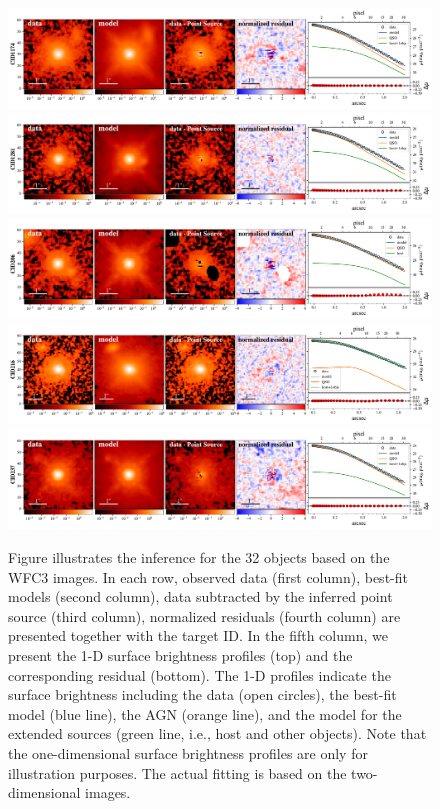 \documentclass[apj]{emulateapj}
\begin{document}
\begin{figure}
\centering
{
\includegraphics[height=0.25\textwidth]{fig/best_fit_CID1174_SB_profile.pdf}
\includegraphics[height=0.25\textwidth]{fig/best_fit_CID1281_SB_profile.pdf}
\includegraphics[height=0.25\textwidth]{fig/best_fit_CID206_SB_profile.pdf}
\includegraphics[height=0.25\textwidth]{fig/best_fit_CID216_SB_profile.pdf}
\includegraphics[height=0.25\textwidth]{fig/best_fit_CID237_SB_profile.pdf}
\caption{\label{fig:AGN_decomp} 
Figure illustrates the inference for the 32 objects based on the WFC3 images.
In each row, observed data (first column), best-fit models (second column), data subtracted by the inferred point source (third column),  normalized residuals (fourth column) are presented together with the target ID. In the fifth column, we present the 1-D surface brightness profiles (top) and the corresponding residual (bottom). The 1-D profiles indicate the surface brightness including the data (open circles), the best-fit model (blue line), the AGN (orange line), and the model for the extended sources (green line, i.e., host and other objects). Note that the one-dimensional surface brightness profiles are only for illustration purposes. The actual fitting is based on the two-dimensional images.
}}
\end{figure} 
\end{document}
